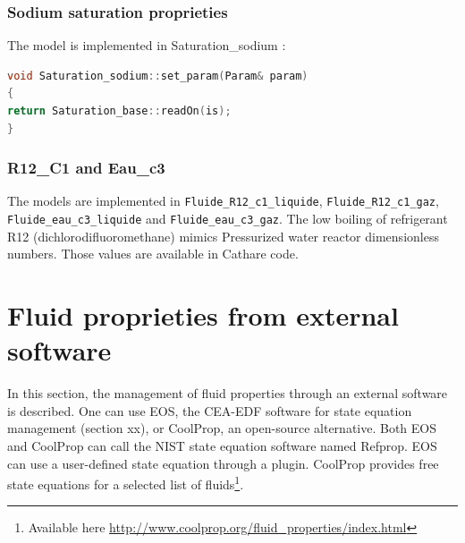 \subsubsection{Sodium saturation proprieties}
The model is implemented in Saturation_sodium :
\begin{lstlisting}[language=c++]
void Saturation_sodium::set_param(Param& param)
{
return Saturation_base::readOn(is); 
}
\end{lstlisting}

\subsubsection{R12_C1 and Eau_c3}
The models are implemented in \texttt{Fluide\_R12\_c1\_liquide}, \texttt{Fluide\_R12\_c1\_gaz}, \texttt{Fluide\_eau\_c3\_liquide} and \texttt{Fluide\_eau\_c3\_gaz}. The low boiling of refrigerant R12 (dichlorodifluoromethane) mimics Pressurized water reactor dimensionless numbers. Those values are available in Cathare code.\\

\section{Fluid proprieties from external software\label{sec:fluid-prop-ext}}
In this section, the management of fluid properties through an external software is described. One can use EOS, the CEA-EDF software for state equation management (section xx), or CoolProp, an open-source alternative. Both EOS and CoolProp can call the NIST state equation software named Refprop. EOS can use a user-defined state equation through a plugin. CoolProp provides free state equations for a selected list of fluids\footnote{Available here \href{http://www.coolprop.org/fluid_properties/index.html}{http://www.coolprop.org/fluid_properties/index.html}}.

